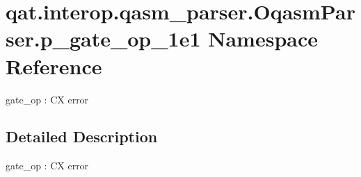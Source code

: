 \hypertarget{namespaceqat_1_1interop_1_1qasm__parser_1_1OqasmParser_1_1p__gate__op__1e1}{\section{qat.\-interop.\-qasm\-\_\-parser.\-Oqasm\-Parser.\-p\-\_\-gate\-\_\-op\-\_\-1e1 Namespace Reference}
\label{namespaceqat_1_1interop_1_1qasm__parser_1_1OqasmParser_1_1p__gate__op__1e1}
}


gate\-\_\-op \-: C\-X error  




\subsection{Detailed Description}
gate\-\_\-op \-: C\-X error 